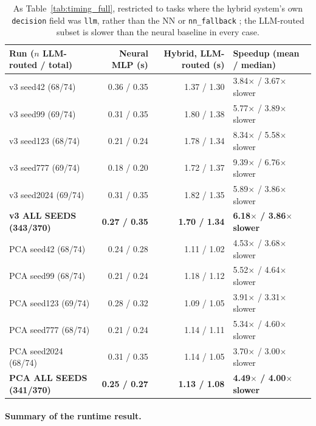 \documentclass[twoside,11pt]{article}
\begin{document}
\begin{table}[htbp]
\centering
\small
\caption{As Table~\ref{tab:timing_full}, restricted to tasks where the
hybrid system's own \texttt{decision} field was \texttt{llm}, rather than
the NN or \texttt{nn\_fallback} ; the LLM-routed subset is slower than
the neural baseline in every case.}
\label{tab:timing_llm_routed_full}
\begin{tabular}{lrrl}
\toprule
Run ($n$ LLM-routed / total) & Neural MLP (s) & Hybrid, LLM-routed (s) & Speedup (mean / median) \\
\midrule
v3 seed42 (68/74) & 0.36 / 0.35 & 1.37 / 1.30 & 3.84$\times$ / 3.67$\times$ slower \\
v3 seed99 (69/74) & 0.31 / 0.35 & 1.80 / 1.38 & 5.77$\times$ / 3.89$\times$ slower \\
v3 seed123 (68/74) & 0.21 / 0.24 & 1.78 / 1.34 & 8.34$\times$ / 5.58$\times$ slower \\
v3 seed777 (69/74) & 0.18 / 0.20 & 1.72 / 1.37 & 9.39$\times$ / 6.76$\times$ slower \\
v3 seed2024 (69/74) & 0.31 / 0.35 & 1.82 / 1.35 & 5.89$\times$ / 3.86$\times$ slower \\
\rowcolor{black!8}
\textbf{v3 ALL SEEDS (343/370)} & \textbf{0.27 / 0.35} & \textbf{1.70 / 1.34} & \textbf{6.18$\times$ / 3.86$\times$ slower} \\
PCA seed42 (68/74) & 0.24 / 0.28 & 1.11 / 1.02 & 4.53$\times$ / 3.68$\times$ slower \\
PCA seed99 (68/74) & 0.21 / 0.24 & 1.18 / 1.12 & 5.52$\times$ / 4.64$\times$ slower \\
PCA seed123 (69/74) & 0.28 / 0.32 & 1.09 / 1.05 & 3.91$\times$ / 3.31$\times$ slower \\
PCA seed777 (68/74) & 0.21 / 0.24 & 1.14 / 1.11 & 5.34$\times$ / 4.60$\times$ slower \\
PCA seed2024 (68/74) & 0.31 / 0.35 & 1.14 / 1.05 & 3.70$\times$ / 3.00$\times$ slower \\
\rowcolor{black!8}
\textbf{PCA ALL SEEDS (341/370)} & \textbf{0.25 / 0.27} & \textbf{1.13 / 1.08} & \textbf{4.49$\times$ / 4.00$\times$ slower} \\
\bottomrule
\end{tabular}
\end{table}

\paragraph{Summary of the runtime result.}
\label{sec:correction}
\end{document}
